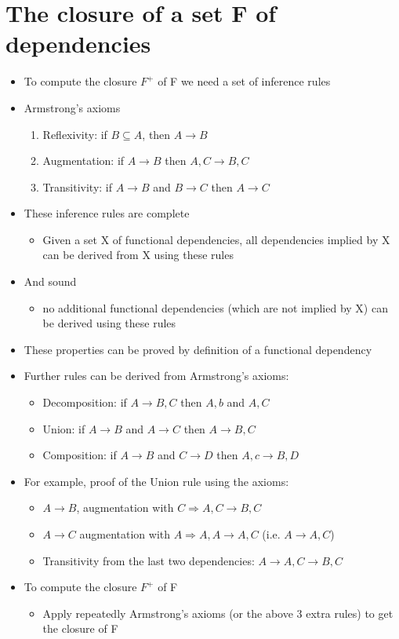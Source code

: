 \documentclass{article}[18pt]
\begin{document}
\section{The closure of a set F of dependencies}
\begin{itemize}
	\item To compute the closure $F^+$ of F we need a set of inference rules
	\item Armstrong's axioms
	\begin{enumerate}
		\item Reflexivity: if $B\subseteq A$, then $A\rightarrow B$
		\item Augmentation: if $A\rightarrow B$ then $A,C\rightarrow B,C$
		\item Transitivity: if $A\rightarrow B$ and $B\rightarrow C$ then $A\rightarrow C$
	\end{enumerate}
	\item These inference rules are complete
	\begin{itemize}
		\item Given a set X of functional dependencies, all dependencies implied by X can be derived from X using these rules
	\end{itemize}
	\item And sound
	\begin{itemize}
		\item no additional functional dependencies (which are not implied by X) can be derived using these rules
	\end{itemize}
	\item These properties can be proved by definition of a functional dependency
	\item Further rules can be derived from Armstrong's axioms:
	\begin{itemize}
		\item Decomposition: if $A\rightarrow B,C$ then $A,b$ and $A,C$
		\item Union: if $A\rightarrow B$ and $A\rightarrow C$ then $A\rightarrow B,C$
		\item Composition: if $A\rightarrow B$ and $C\rightarrow D$ then $A,c\rightarrow B,D$
	\end{itemize}
	\item For example, proof of the Union rule using the axioms:
	\begin{itemize}
		\item $A\rightarrow B$, augmentation with $C\Rightarrow A,C \rightarrow B,C$
		\item $A\rightarrow C$ augmentation with $A\Rightarrow A,A\rightarrow A,C$ (i.e. $A\rightarrow A,C$)
		\item Transitivity from the last two dependencies: $A\rightarrow A,C \rightarrow B,C$
	\end{itemize}
	\item To compute the closure $F^+$ of F
	\begin{itemize}
		\item Apply repeatedly Armstrong's axioms (or the above 3 extra rules) to get the closure of F
	\end{itemize}
\end{itemize}
\end{document}
